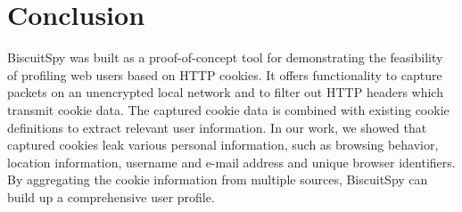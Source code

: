 \section{Conclusion}
\label{sec:conclusion}

BiscuitSpy was built as a proof-of-concept tool for demonstrating the feasibility of profiling web users based on HTTP cookies. It offers functionality to capture packets on an unencrypted local network and to filter out HTTP headers which transmit cookie data. The captured cookie data is combined with existing cookie definitions to extract relevant user information. In our work, we showed that captured cookies leak various personal information, such as browsing behavior, location information, username and e-mail address and unique browser identifiers. By aggregating the cookie information from multiple sources, BiscuitSpy can build up a comprehensive user profile.